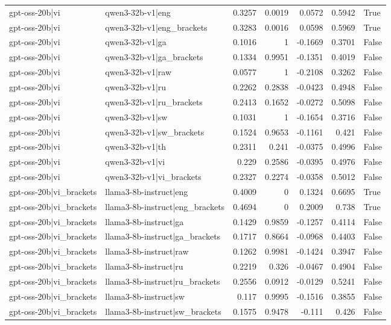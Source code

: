 \begin{table}
\begin{tabular}{l l r r r r l}
gpt-oss-20b|vi & qwen3-32b-v1|eng & 0.3257 & 0.0019 & 0.0572 & 0.5942 & True \\
gpt-oss-20b|vi & qwen3-32b-v1|eng_brackets & 0.3283 & 0.0016 & 0.0598 & 0.5969 & True \\
gpt-oss-20b|vi & qwen3-32b-v1|ga & 0.1016 & 1 & -0.1669 & 0.3701 & False \\
gpt-oss-20b|vi & qwen3-32b-v1|ga_brackets & 0.1334 & 0.9951 & -0.1351 & 0.4019 & False \\
gpt-oss-20b|vi & qwen3-32b-v1|raw & 0.0577 & 1 & -0.2108 & 0.3262 & False \\
gpt-oss-20b|vi & qwen3-32b-v1|ru & 0.2262 & 0.2838 & -0.0423 & 0.4948 & False \\
gpt-oss-20b|vi & qwen3-32b-v1|ru_brackets & 0.2413 & 0.1652 & -0.0272 & 0.5098 & False \\
gpt-oss-20b|vi & qwen3-32b-v1|sw & 0.1031 & 1 & -0.1654 & 0.3716 & False \\
gpt-oss-20b|vi & qwen3-32b-v1|sw_brackets & 0.1524 & 0.9653 & -0.1161 & 0.421 & False \\
gpt-oss-20b|vi & qwen3-32b-v1|th & 0.2311 & 0.241 & -0.0375 & 0.4996 & False \\
gpt-oss-20b|vi & qwen3-32b-v1|vi & 0.229 & 0.2586 & -0.0395 & 0.4976 & False \\
gpt-oss-20b|vi & qwen3-32b-v1|vi_brackets & 0.2327 & 0.2274 & -0.0358 & 0.5012 & False \\
gpt-oss-20b|vi_brackets & llama3-8b-instruct|eng & 0.4009 & 0 & 0.1324 & 0.6695 & True \\
gpt-oss-20b|vi_brackets & llama3-8b-instruct|eng_brackets & 0.4694 & 0 & 0.2009 & 0.738 & True \\
gpt-oss-20b|vi_brackets & llama3-8b-instruct|ga & 0.1429 & 0.9859 & -0.1257 & 0.4114 & False \\
gpt-oss-20b|vi_brackets & llama3-8b-instruct|ga_brackets & 0.1717 & 0.8664 & -0.0968 & 0.4403 & False \\
gpt-oss-20b|vi_brackets & llama3-8b-instruct|raw & 0.1262 & 0.9981 & -0.1424 & 0.3947 & False \\
gpt-oss-20b|vi_brackets & llama3-8b-instruct|ru & 0.2219 & 0.326 & -0.0467 & 0.4904 & False \\
gpt-oss-20b|vi_brackets & llama3-8b-instruct|ru_brackets & 0.2556 & 0.0912 & -0.0129 & 0.5241 & False \\
gpt-oss-20b|vi_brackets & llama3-8b-instruct|sw & 0.117 & 0.9995 & -0.1516 & 0.3855 & False \\
gpt-oss-20b|vi_brackets & llama3-8b-instruct|sw_brackets & 0.1575 & 0.9478 & -0.111 & 0.426 & False \\

\end{tabular}
\end{table}
